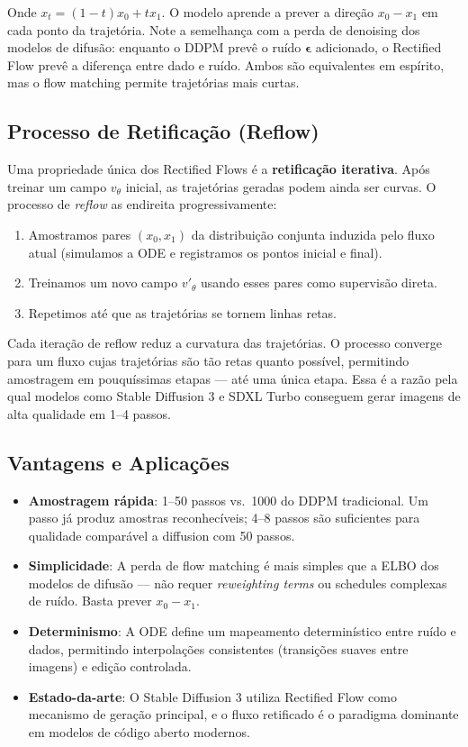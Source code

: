 \documentclass{tufte-handout}
\let\subsubsection\subsection
\begin{document}
Onde $x_t = (1 - t) x_0 + t x_1$. O modelo aprende a prever a direção $x_0 - x_1$ em cada ponto da trajetória. Note a semelhança com a perda de denoising dos modelos de difusão: enquanto o DDPM prevê o ruído $\boldsymbol{\epsilon}$ adicionado, o Rectified Flow prevê a diferença entre dado e ruído. Ambos são equivalentes em espírito, mas o flow matching permite trajetórias mais curtas.

\subsubsection{Processo de Retificação (Reflow)}

Uma propriedade única dos Rectified Flows é a \textbf{retificação iterativa}. Após treinar um campo $v_\theta$ inicial, as trajetórias geradas podem ainda ser curvas. O processo de \textit{reflow} as endireita progressivamente:

\begin{enumerate}
    \item Amostramos pares $(x_0, x_1)$ da distribuição conjunta induzida pelo fluxo atual (simulamos a ODE e registramos os pontos inicial e final).
    \item Treinamos um novo campo $v'_\theta$ usando esses pares como supervisão direta.
    \item Repetimos até que as trajetórias se tornem linhas retas.
\end{enumerate}

Cada iteração de reflow reduz a curvatura das trajetórias. O processo converge para um fluxo cujas trajetórias são tão retas quanto possível, permitindo amostragem em pouquíssimas etapas --- até uma única etapa. Essa é a razão pela qual modelos como Stable Diffusion 3 e SDXL Turbo conseguem gerar imagens de alta qualidade em 1--4 passos.

\subsubsection{Vantagens e Aplicações}

\begin{itemize}
    \item \textbf{Amostragem rápida}: 1--50 passos vs.~1000 do DDPM tradicional. Um passo já produz amostras reconhecíveis; 4--8 passos são suficientes para qualidade comparável a diffusion com 50 passos.
    \item \textbf{Simplicidade}: A perda de flow matching é mais simples que a ELBO dos modelos de difusão --- não requer \textit{reweighting terms} ou schedules complexas de ruído. Basta prever $x_0 - x_1$.
    \item \textbf{Determinismo}: A ODE define um mapeamento determinístico entre ruído e dados, permitindo interpolações consistentes (transições suaves entre imagens) e edição controlada.
    \item \textbf{Estado-da-arte}: O Stable Diffusion 3 utiliza Rectified Flow como mecanismo de geração principal, e o fluxo retificado é o paradigma dominante em modelos de código aberto modernos.
\end{itemize}
\end{document}

